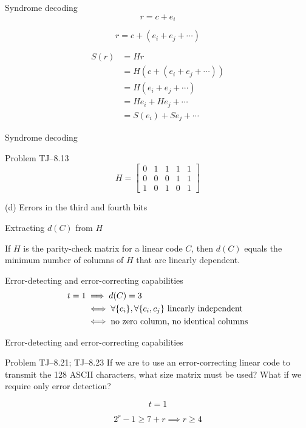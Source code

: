 \begin{frame}{Syndrome decoding}
  \[
	r = c + e_i
  \]

  \[
	r = c + (e_{i} + e_{j} + \cdots)
  \]

  \begin{definition}[Syndrome]
	\begin{align*}
	  S(r) &= H r \\
	  	&= H(c + (e_{i} + e_{j} + \cdots)) \\
		&= H (e_{i} + e_{j} + \cdots) \\
		&= H e_{i} + H e_{j} + \cdots \\
		&= S(e_i) + S{e_{j}} + \cdots
	\end{align*}
  \end{definition}
\end{frame}
\begin{frame}{Syndrome decoding}
  \begin{exampleblock}{Problem TJ--8.13}
	\[
	  H = \begin{bmatrix}
		0 & 1 & 1 & 1 & 1 \\
		0 & 0 & 0 & 1 & 1 \\
		1 & 0 & 1 & 0 & 1
	  \end{bmatrix}
	\]

	\centerline{(d) Errors in the third and fourth bits}
  \end{exampleblock}
\end{frame}
\begin{frame}{Extracting $d(C)$ from $H$}
  \begin{theorem}[]
	If $H$ is the parity-check matrix for a linear code $C$, then
	$d(C)$ equals the minimum number of columns of $H$ that are linearly dependent.
  \end{theorem}
\end{frame}
\begin{frame}{Error-detecting and error-correcting capabilities}
  \begin{align*}
	t = 1 & \implies d(C) = 3 \\
	  &\iff \forall \{c_i\}, \forall \{c_i, c_j\} \text{ linearly independent} \\
	  &\iff \text{no zero column, no identical columns}
  \end{align*}
\end{frame}
\begin{frame}{Error-detecting and error-correcting capabilities}
  \begin{exampleblock}{Problem TJ--8.21; TJ--8.23}
	If we are to use an error-correcting linear code to transmit the 128 ASCII characters,
	what size matrix must be used? What if we require only error detection?
  \end{exampleblock}

  \[
	t = 1
  \]

  \[
	2^r - 1 \ge 7 + r \implies r \ge 4
  \]
\end{frame}
